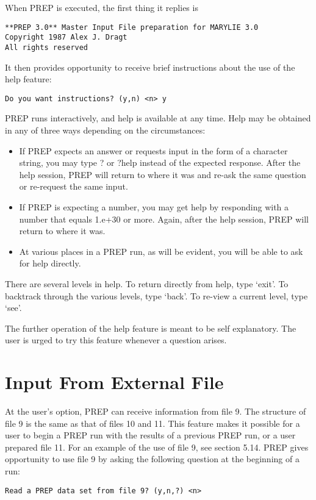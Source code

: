 When PREP is executed, the first thing it replies is
\begin{footnotesize}
\begin{verbatim}
**PREP 3.0** Master Input File preparation for MARYLIE 3.0
Copyright 1987 Alex J. Dragt
All rights reserved
\end{verbatim}
\end{footnotesize}
\pagebreak It then provides opportunity to receive brief instructions about
the use of the help feature:
\begin{footnotesize}
\begin{verbatim}
Do you want instructions? (y,n) <n> y
\end{verbatim}
\end{footnotesize} PREP runs interactively, and help is available at any
time. Help may be obtained in any of three ways depending on the
circumstances:
\begin{itemize}
\item If PREP expects an answer or requests input in the form of a
character string, you may type ? or ?help instead of the expected response.
After the help session, PREP will return to where it was and re-ask the
same question or re-request the same input.

\item If PREP is expecting a number, you may get help by responding with a
number that equals 1.e+30 or more. Again, after the help session, PREP will
return to where it was.

\item At various places in a PREP run, as will be evident, you will be able
to ask for help directly.
\end{itemize} There are several levels in help. To return directly from
help, type `exit'. To backtrack through the various levels, type `back'. To
re-view a current level, type `see'.

The further operation of the help feature is meant to be self explanatory.
The user is urged to try this feature whenever a question arises.


\section{Input From External File} At the user's option, PREP can receive
information from file 9. The structure of file 9 is the same as that of
files 10 and 11. This feature makes it possible for a user to begin a PREP
run with the results of a previous PREP run, or a user prepared file 11.
For an example of the use of file 9, see section 5.14. PREP gives
opportunity to use file 9 by asking the following question at the beginning
of a run:
\begin{footnotesize}
\begin{verbatim}
Read a PREP data set from file 9? (y,n,?) <n>
\end{verbatim}
\end{footnotesize}

